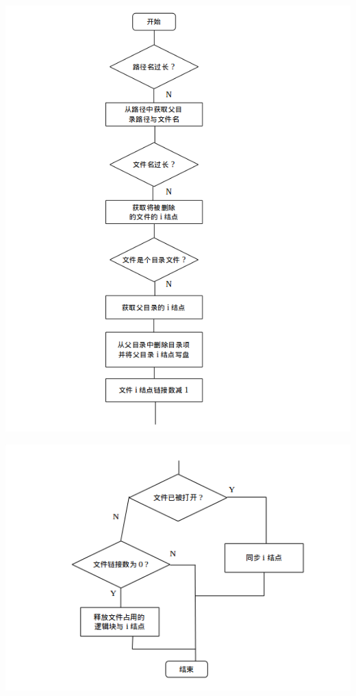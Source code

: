 \documentclass[nofonts, titlepage]{ctexart}
\begin{document}
\begin{itemize}
  \includegraphics[width=15cm]{./images/./unlink_1.png}

  \includegraphics[width=15cm]{./images/./unlink_2.png}
  \end{itemize}
\end{document}
